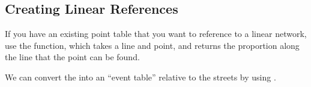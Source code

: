 \documentclass[a4paper,11pt,english]{sphinxmanual}
\begin{document}
\subsection{Creating Linear References}
\label{\detokenize{advanced:creating-linear-references}}
If you have an existing point table that you want to reference to a linear network, use the  function, which takes a line and point, and returns the proportion along the line that the point can be found.

\begin{sphinxVerbatim}[commandchars=\\\{\}]
  

  
\end{sphinxVerbatim}

We can convert the  into an “event table” relative to the streets by using .
\end{document}
